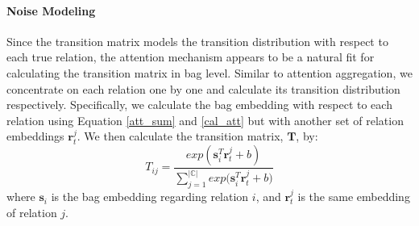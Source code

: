 \paragraph{Noise Modeling}
 Since the transition matrix models the transition distribution with respect to each true relation, the attention mechanism appears to be a natural fit for calculating the transition matrix in bag level. Similar to attention aggregation, we concentrate on each relation one by one and calculate its transition distribution respectively.
Specifically, we calculate the bag embedding with respect to each relation using Equation \ref{att_sum} and \ref{cal_att} but with another set of relation embeddings $\mathbf{r}_t^j$.
We then calculate the transition matrix, $\mathbf{T}$, by:
\begin{equation}
T_{ij} = \frac{exp({\mathbf{s}_i^T \mathbf{r}_t^j  + b})}{\sum_{j=1}^{|\mathbb{C}|}{exp(\mathbf{s}_i^T \mathbf{r}_t^j + b})}
\end{equation}
where $\mathbf{s}_i$ is the bag embedding regarding relation $i$, and $\mathbf{r}_t^j$ is the same embedding of relation $j$.


